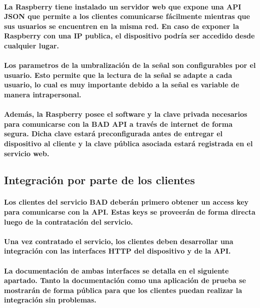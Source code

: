 \documentclass{article}
\begin{document}
\paragraph{
La Raspberry tiene instalado un servidor web que expone una API JSON que permite a los clientes comunicarse fácilmente mientras que sus usuarios se encuentren en la misma red. En caso de exponer la Raspberry con una IP publica, el dispositivo podría ser accedido desde cualquier lugar.
}
\paragraph{
Los parametros de la umbralización de la señal son configurables por el usuario. Esto permite que la lectura de la señal se adapte a cada usuario, lo cual es muy importante debido a la señal es variable de manera intrapersonal.
}
\paragraph{
Además, la Raspberry posee el software y la clave privada necesarios para comunicarse con la BAD API a través de internet de forma segura. Dicha clave estará preconfigurada antes de entregar el dispositivo al cliente y la clave pública asociada estará registrada en el servicio web.
}

\subsection{Integración por parte de los clientes}
\paragraph{
Los clientes del servicio BAD deberán primero obtener un access key para comunicarse con la API. Estas keys se proveerán de forma directa luego de la contratación del servicio.
}
\paragraph{
Una vez contratado el servicio, los clientes deben desarrollar una integración con las interfaces HTTP del dispositivo y de la API.
}
\paragraph{
La documentación de ambas interfaces se detalla en el siguiente apartado. Tanto la documentación como una aplicación de prueba se mostrarán de forma pública para que los clientes puedan realizar la integración sin problemas.
}
\end{document}
